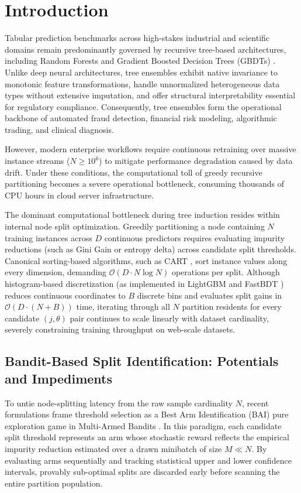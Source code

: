 \section{Introduction}
\label{sec:introduction}

Tabular prediction benchmarks across high-stakes industrial and scientific domains remain predominantly governed by recursive tree-based architectures, including Random Forests \cite{breiman2001random} and Gradient Boosted Decision Trees (GBDTs) \cite{ke2017lightgbm,chen2016xgboost}. Unlike deep neural architectures, tree ensembles exhibit native invariance to monotonic feature transformations, handle unnormalized heterogeneous data types without extensive imputation, and offer structural interpretability essential for regulatory compliance. Consequently, tree ensembles form the operational backbone of automated fraud detection, financial risk modeling, algorithmic trading, and clinical diagnosis.

However, modern enterprise workflows require continuous retraining over massive instance streams ($N \ge 10^6$) to mitigate performance degradation caused by data drift. Under these conditions, the computational toll of greedy recursive partitioning becomes a severe operational bottleneck, consuming thousands of CPU hours in cloud server infrastructure.

The dominant computational bottleneck during tree induction resides within internal node split optimization. Greedily partitioning a node containing $N$ training instances across $D$ continuous predictors requires evaluating impurity reductions (such as Gini Gain or entropy delta) across candidate split thresholds. Canonical sorting-based algorithms, such as CART \cite{breiman1984classification}, sort instance values along every dimension, demanding $\mathcal{O}(D \cdot N \log N)$ operations per split. Although histogram-based discretization (as implemented in LightGBM \cite{ke2017lightgbm} and FastBDT \cite{keck2017fastbdt}) reduces continuous coordinates to $B$ discrete bins and evaluates split gains in $\mathcal{O}(D \cdot (N + B))$ time, iterating through all $N$ partition residents for every candidate $(j, \theta)$ pair continues to scale linearly with dataset cardinality, severely constraining training throughput on web-scale datasets.

\subsection{Bandit-Based Split Identification: Potentials and Impediments}
To untie node-splitting latency from the raw sample cardinality $N$, recent formulations frame threshold selection as a Best Arm Identification (BAI) pure exploration game in Multi-Armed Bandits \cite{tiwari2022mabsplit,maron1994hoeffding}. In this paradigm, each candidate split threshold represents an arm whose stochastic reward reflects the empirical impurity reduction estimated over a drawn minibatch of size $M \ll N$. By evaluating arms sequentially and tracking statistical upper and lower confidence intervals, provably sub-optimal splits are discarded early before scanning the entire partition population.


